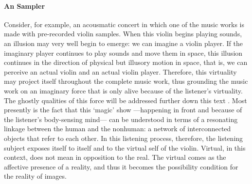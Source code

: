 \paragraph{An Sampler}
Consider, for example, an acousmatic concert in which one of the music works is made with pre-recorded violin samples. When this violin begins playing sounds, an illusion may very well begin to emerge: we can imagine a violin player. If the imaginary player continues to play sounds and move them in space, this illusion continues in the direction of physical but illusory motion in space, that is, we can perceive an actual violin and an actual violin player. Therefore, this virtuality may project itself throughout the complete music work, thus grounding the music work on an imaginary force that is only alive because of the listener's virtuality. The ghostly qualities of this force will be addressed further down this text . Most presently is the fact that this `magic' show ---happening in front and because of the listener's body-sensing mind--- can be understood in terms of a resonating linkage between the human and the nonhuman: a network of interconnected objects that refer to each other. In this listening process, therefore, the listening subject exposes itself to itself and to the virtual self of the violin. Virtual, in this context, does not mean in opposition to the real. The virtual comes as the affective presence of a reality, and thus it becomes the possibility condition for the reality of images. 

